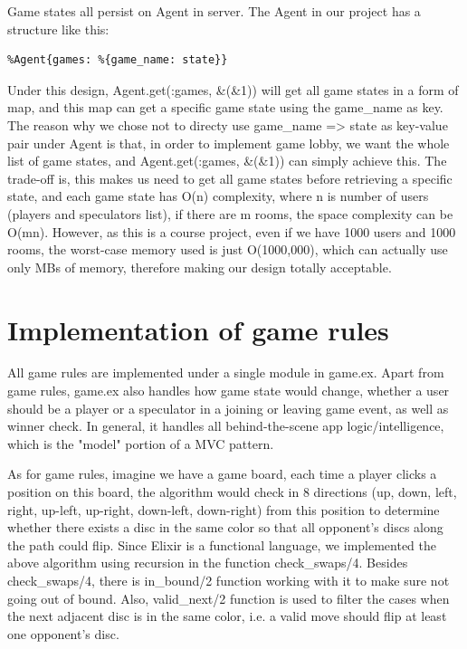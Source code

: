Game states all persist on Agent in server. The Agent in our project has a 
structure like this:
\begin{lstlisting}
%Agent{games: %{game_name: state}}
\end{lstlisting}
Under this design, Agent.get(:games, \&(\&1)) will get all game states in a form 
of map, and this map can get a specific game state using the game\_name as key. 
The reason why we chose not to directy use {game\_name => state} as key-value 
pair under Agent is that, in order to implement game lobby, we want the whole 
list of game states, and Agent.get(:games, \&(\&1)) can simply achieve this. The 
trade-off is, this makes us need to get all game states before retrieving a 
specific state, and each game state has O(n) complexity, where n is number of 
users (players and speculators list), if there are m rooms, the space complexity 
can be O(mn). However, as this is a course project, even if we have 1000 users 
and 1000 rooms, the worst-case memory used is just O(1000,000), which can 
actually use only MBs of memory, therefore making our design totally acceptable.

\section{Implementation of game rules}
All game rules are implemented under a single module in game.ex. Apart from game 
rules, game.ex also handles how game state would change, whether a user should be 
a player or a speculator in a joining or leaving game event, as well as winner check. 
In general, it handles all behind-the-scene app logic/intelligence, which is the 
"model" portion of a MVC pattern.

As for game rules, imagine we have a game board, each time a player clicks a position 
on this board, the algorithm would check in 8 directions (up, down, left, right, 
up-left, up-right, down-left, down-right) from this position to determine whether 
there exists a disc in the same color so that all opponent's discs along the path 
could flip. Since Elixir is a functional language, we implemented the above algorithm 
using recursion in the function check\_swaps/4. Besides check\_swaps/4, there is 
in\_bound/2 function working with it to make sure not going out of bound. Also, 
valid\_next/2 function is used to filter the cases when the next adjacent disc is 
in the same color, i.e. a valid move should flip at least one opponent's disc.

